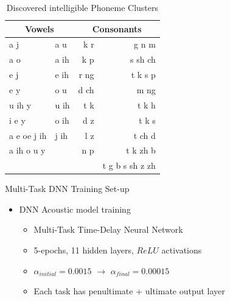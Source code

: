 \documentclass[final]{beamer} %
\begin{document}
\begin{frame}
\begin{columns}
\begin{column}{0.23\textwidth}
{          \begin{table}[!htbp]
            \centering
            \caption{Discovered intelligible Phoneme Clusters}
            \label{tab:results}
            \begin{adjustbox}{width=.5\textwidth}
              \begin{tabular}{llrr}
                \toprule
                \multicolumn{2}{c}{Vowels} &  \multicolumn{2}{c}{ Consonants} \\
                \midrule
                a  j & a  u  &   k  r &     g n m \\
                a  o & a  ih  &    k p  &    s sh ch\\
                e  j & e  ih & r ng & t k s p \\
                e  y &o  u & d ch & m ng\\
                u  ih  y   & u  ih & t k & t k h\\
                i  e  y &o  ih & d z&t k s \\
                a  e  oe  j ih & j ih & l z  & t ch d\\
                a  ih  o  u  y &  &  n p & t k zh b  \\
                &&& t g b s sh z zh \\
                \bottomrule
              \end{tabular}
            \end{adjustbox}
          \end{table}


                  \vfill
        
        \begin{block}{\boxnumber Multi-Task DNN Training Set-up}          
          \begin{itemize}    
          \item DNN Acoustic model training
            \begin{itemize}
            \item Multi-Task Time-Delay Neural Network
            \item 5-epochs, 11 hidden layers, $ReLU$ activations
            \item $\alpha_{initial}=0.0015$ $\rightarrow$ $\alpha_{final}=0.00015$
            \item Each task has penultimate + ultimate output layer
            \end{itemize}
          \end{itemize}
        \end{block}

}
\end{column}
\end{columns}
\end{frame}
\end{document}
